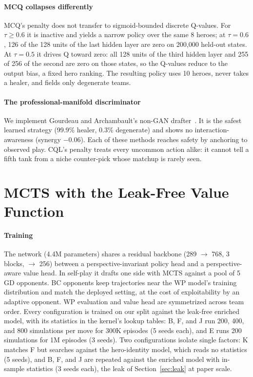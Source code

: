 \documentclass[journal]{IEEEtran}
\begin{document}
\paragraph{MCQ collapses differently} MCQ's penalty does not transfer to sigmoid-bounded discrete Q-values. For $\tau \geq 0.6$ it is inactive and yields a narrow policy over the same 8 heroes; at $\tau = 0.6$, 126 of the 128 units of the last hidden layer are zero on 200,000 held-out states. At $\tau = 0.5$ it drives Q toward zero: all 128 units of the third hidden layer and 255 of 256 of the second are zero on those states, so the Q-values reduce to the output bias, a fixed hero ranking. The resulting policy uses 10 heroes, never takes a healer, and fields only degenerate teams.

\paragraph{The professional-manifold discriminator} We implement Gourdeau and Archambault's non-GAN drafter~\cite{gourdeau2021discriminative}. It is the safest learned strategy (99.9\% healer, 0.3\% degenerate) and shows no interaction-awareness (synergy $-$0.06). Each of these methods reaches safety by anchoring to observed play. CQL's penalty treats every uncommon action alike: it cannot tell a fifth tank from a niche counter-pick whose matchup is rarely seen.

\section{MCTS with the Leak-Free Value Function}
\label{sec:mcts}

\paragraph{Training} The network (4.4M parameters) shares a residual backbone (289 $\to$ 768, 3 blocks, $\to$ 256) between a perspective-invariant policy head and a perspective-aware value head. In self-play it drafts one side with MCTS against a pool of 5 GD opponents. BC opponents keep trajectories near the WP model's training distribution and match the deployed setting, at the cost of exploitability by an adaptive opponent. WP evaluation and value head are symmetrized across team order. Every configuration is trained on our split against the leak-free enriched model, with its statistics in the kernel's lookup tables: B, F, and J run 200, 400, and 800 simulations per move for 300K episodes (5 seeds each), and E runs 200 simulations for 1M episodes (3 seeds). Two configurations isolate single factors: K matches F but searches against the hero-identity model, which reads no statistics (5 seeds), and B, F, and J are repeated against the enriched model with in-sample statistics (3 seeds each), the leak of Section~\ref{sec:leak} at paper scale.
\end{document}
